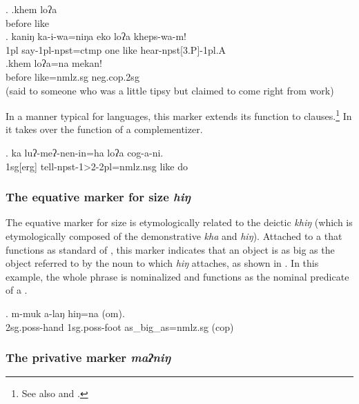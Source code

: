  
  \ex. \ag.khem loʔa\\
 before like\\
 \bg. kaniŋ ka-i-wa=niŋa eko loʔa kheps-wa-m!\\
 {\sc 1pl} say{\sc -1pl-npst=ctmp} one like hear{\sc -npst[3.P]-1pl.A}\\
  
  \bg.khem loʔa=na mekan!\\
  before like{\sc =nmlz.sg} {\sc neg.cop.2sg}\\
   (said to someone who was a little tipsy but claimed to come right from work)
  
  In a manner typical for  languages, this marker extends its function to clauses.\footnote{See also \citet{DeLancey1985_Etymological} and \citet{Genetti1991From}.} In \Next it takes over the function of a complementizer.
  
  \exg. ka luʔ-meʔ-nen-in=ha loʔa  cog-a-ni.\\
  {\sc 1sg[erg]}  tell{\sc -npst-1>2-2pl=nmlz.nsg} like do\\
   

  
\subsubsection{The equative marker for size \emph{hiŋ}}

The equative marker for size is etymologically related to the deictic  \emph{khiŋ} (which is etymologically composed of the demonstrative \emph{kha} and \emph{hiŋ}). Attached to a  that functions as standard of , this  marker indicates that an object is as big as the  object referred to by the noun to which \emph{hiŋ} attaches, as shown in \Next. In this example, the whole phrase is nominalized and functions as the nominal predicate of a .

	\exg. m-muk a-laŋ hiŋ=na (om).\\
 {\sc 2sg.poss-}hand {\sc 1sg.poss-}foot 	as\_big\_as{\sc =nmlz.sg} ({\sc cop})	\\

\subsubsection{The privative marker \emph{maʔniŋ}}

